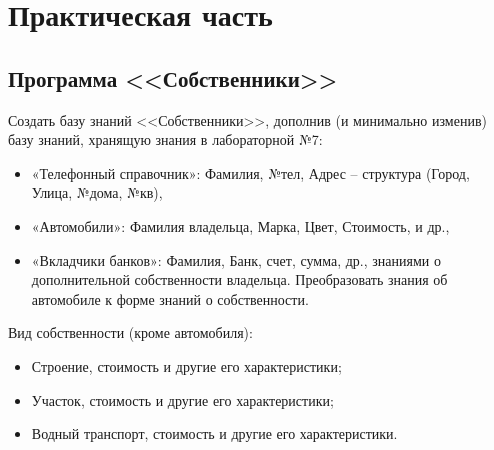 \chapter{Практическая часть}

\section*{Программа <<Собственники>>}

Создать базу знаний <<Собственники>>, дополнив (и минимально изменив) базу
знаний, хранящую знания  в лабораторной №7:
\begin{itemize}
	\item «Телефонный справочник»: Фамилия, №тел, Адрес – структура (Город,
	Улица, №дома, №кв),
	\item «Автомобили»: Фамилия владельца, Марка, Цвет, Стоимость, и др.,
	\item «Вкладчики банков»: Фамилия, Банк, счет, сумма, др.,
	знаниями о дополнительной собственности владельца. Преобразовать знания об
	автомобиле к форме знаний о собственности.
\end{itemize}

Вид собственности (кроме автомобиля):
\begin{itemize}
	\item Строение, стоимость и другие его характеристики;
	\item Участок, стоимость и другие его характеристики;
	\item Водный транспорт, стоимость и другие его характеристики.
\end{itemize}

